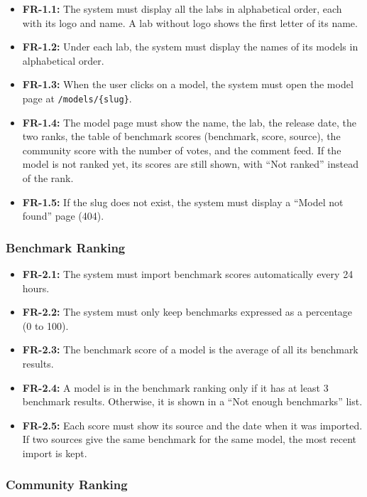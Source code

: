 \documentclass[11pt,a4paper]{article}
\begin{document}
\begin{itemize}
  \item \textbf{FR-1.1:} The system must display all the labs in alphabetical order, each with its logo and name. A lab without logo shows the first letter of its name.
  \item \textbf{FR-1.2:} Under each lab, the system must display the names of its models in alphabetical order.
  \item \textbf{FR-1.3:} When the user clicks on a model, the system must open the model page at \texttt{/models/\{slug\}}.
  \item \textbf{FR-1.4:} The model page must show the name, the lab, the release date, the two ranks, the table of benchmark scores (benchmark, score, source), the community score with the number of votes, and the comment feed. If the model is not ranked yet, its scores are still shown, with ``Not ranked'' instead of the rank.
  \item \textbf{FR-1.5:} If the slug does not exist, the system must display a ``Model not found'' page (404).
\end{itemize}

\subsubsection{Benchmark Ranking}

\begin{itemize}
  \item \textbf{FR-2.1:} The system must import benchmark scores automatically every 24 hours.
  \item \textbf{FR-2.2:} The system must only keep benchmarks expressed as a percentage (0 to 100).
  \item \textbf{FR-2.3:} The benchmark score of a model is the average of all its benchmark results.
  \item \textbf{FR-2.4:} A model is in the benchmark ranking only if it has at least 3 benchmark results. Otherwise, it is shown in a ``Not enough benchmarks'' list.
  \item \textbf{FR-2.5:} Each score must show its source and the date when it was imported. If two sources give the same benchmark for the same model, the most recent import is kept.
\end{itemize}

\subsubsection{Community Ranking}
\end{document}
